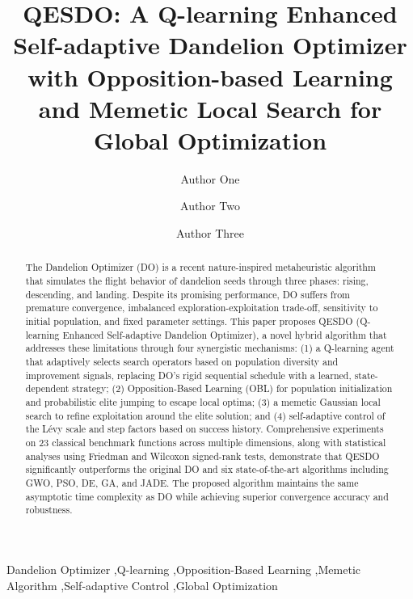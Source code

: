 \documentclass[preprint,12pt]{elsarticle}
\begin{document}
\begin{frontmatter}

\title{QESDO: A Q-learning Enhanced Self-adaptive Dandelion Optimizer with Opposition-based Learning and Memetic Local Search for Global Optimization}

\author[inst1]{Author One}

\author[inst1]{Author Two}

\author[inst2]{Author Three}




\begin{abstract}
The Dandelion Optimizer (DO) is a recent nature-inspired metaheuristic algorithm that simulates the flight behavior of dandelion seeds through three phases: rising, descending, and landing. Despite its promising performance, DO suffers from premature convergence, imbalanced exploration-exploitation trade-off, sensitivity to initial population, and fixed parameter settings. This paper proposes QESDO (Q-learning Enhanced Self-adaptive Dandelion Optimizer), a novel hybrid algorithm that addresses these limitations through four synergistic mechanisms: (1) a Q-learning agent that adaptively selects search operators based on population diversity and improvement signals, replacing DO's rigid sequential schedule with a learned, state-dependent strategy; (2) Opposition-Based Learning (OBL) for population initialization and probabilistic elite jumping to escape local optima; (3) a memetic Gaussian local search to refine exploitation around the elite solution; and (4) self-adaptive control of the Lévy scale and step factors based on success history. Comprehensive experiments on 23 classical benchmark functions across multiple dimensions, along with statistical analyses using Friedman and Wilcoxon signed-rank tests, demonstrate that QESDO significantly outperforms the original DO and six state-of-the-art algorithms including GWO, PSO, DE, GA, and JADE. The proposed algorithm maintains the same asymptotic time complexity as DO while achieving superior convergence accuracy and robustness.
\end{abstract}

\begin{keyword}
Dandelion Optimizer \sep Q-learning \sep Opposition-Based Learning \sep Memetic Algorithm \sep Self-adaptive Control \sep Global Optimization
\end{keyword}

\end{frontmatter}
\end{document}
